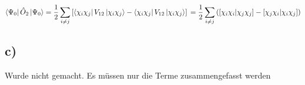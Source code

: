 \begin{equation}
\Bra{\Psi_0} \hat{O}_2 \Ket{\Psi_0} = \frac{1}{2} \sum_{i \neq j} \left[ \Bra{\chi_i \chi_j} V_{12} \Ket{\chi_i \chi_j} - \Bra{\chi_i \chi_j} V_{12} \Ket{\chi_i \chi_j} \right] \\
= \frac{1}{2} \sum_{i \neq j} \left( \left[ \chi_i \chi_i | \chi_j \chi_j \right] - \left[ \chi_j \chi_i | \chi_i \chi_j \right] \right)
\end{equation}

\subsection{c)}

Wurde nicht gemacht. Es m\"ussen nur die Terme zusammengefasst werden
